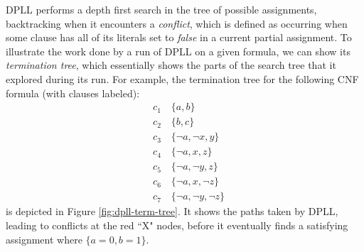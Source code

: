 \documentclass[12pt]{article}
\begin{document}
DPLL performs a depth first search in the tree of possible assignments, backtracking when it encounters a \textit{conflict}, which is defined as occurring when some clause has all of its literals set to \textit{false} in a current partial assignment. To illustrate the work done by a run of DPLL on a given formula, we can show its \textit{termination tree}, which essentially shows the parts of the search tree that it explored during its run. For example, the termination tree for the following CNF formula (with clauses labeled):
\begin{align*}
    &c_1 \quad \{a,b\}\\
    &c_2 \quad \{b,c\}\\
    &c_3 \quad \{\neg a, \neg x, y\} \\
    &c_4 \quad \{\neg a, x, z\} \\
    &c_5 \quad \{\neg a, \neg y, z\} \\
    &c_6 \quad \{\neg a, x, \neg z\} \\
    &c_7 \quad \{\neg a, \neg y, \neg z\}
\end{align*}
is depicted in Figure \ref{fig:dpll-term-tree}. It shows the paths taken by DPLL, leading to conflicts at the red ``X" nodes, before it eventually finds a satisfying assignment where $\{a=0,b=1\}$.
\end{document}
